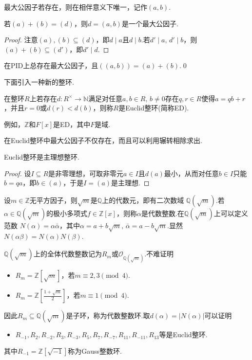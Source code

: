 最大公因子若存在，则在相伴意义下唯一，记作$(a,b)$.
\begin{prop}
    若$(a)+(b)=(d)$，则$d=(a,b)$是一个最大公因子.
\end{prop}
\begin{proof}
    注意$(a),(b)\subseteq(d)$，即$d\mid a$且$d\mid b$.若$d'\mid a,\,d'\mid b$，则$(a)+(b)\subseteq(d')$，即$d'\mid d$.
\end{proof}
\begin{cor*}
    在PID上总存在最大公因子，且$((a,b))=(a)+(b)$.\qed
\end{cor*}

下面引入一种新的整环.
\begin{definition}
    在整环$R$上若存在$d\colon R^\times\to\mathbb{N}$满足对任意$a,b\in R,\,b\ne 0$存在$q,r\in R$使得$a=qb+r$，并且$r=0$或$d(r)<d(b)$，则称$R$是{\heiti Euclid整环}(简称ED).
\end{definition}

例如，$\mathbb{Z}$和$F[x]$是ED，其中$F$是域.

在Euclid整环中最大公因子不仅存在，而且可以利用辗转相除求出.
\begin{thm}
    Euclid整环是主理想整环.
\end{thm}
\begin{proof}
    设$I\subseteq R$是非零理想，可取非零元$a\in I$且$d(a)$最小，从而对任意$b\in I$只能$b=qa$，即$b\in(a)$，于是$I=(a)$是主理想.
\end{proof}

设$m\in\mathbb{Z}$无平方因子，则$\sqrt{m}$是$\mathbb{Q}$上的代数元，即有{\heiti 二次数域} $\mathbb{Q}(\sqrt{m})$.若$\alpha\in\mathbb{Q}(\sqrt{m})$的极小多项式$f\in\mathbb{Z}[x]$，则称$\alpha$是{\heiti 代数整数}.在$\mathbb{Q}(\sqrt{m})$上可以定义{\heiti 范数} $N(\alpha)=\alpha\bar\alpha$，其中$\alpha=a+b\sqrt{m},\,\bar\alpha=a-b\sqrt{m}$.显然$N(\alpha\beta)=N(\alpha)N(\beta)$.

$\mathbb{Q}(\sqrt{m})$上的全体代数整数记为$R_m$或$\mathcal{O}_{\mathbb{Q}(\sqrt{m})}$.不难证明
\begin{itemize}
    \item $R_m=\mathbb{Z}[\sqrt{m}]$，若$m\equiv 2,3\pmod{4}$.
    \item $R_m=\mathbb{Z}[\frac{1+\sqrt{m}}{2}]$，若$m\equiv 1\pmod{4}$.
\end{itemize}
因此$R_m\subseteq\mathbb{Q}(\sqrt{m})$是子环，称为{\heiti 代数整数环}.取$d(\alpha)=|N(\alpha)|$可以证明
\begin{itemize}
    \item $R_{-1},R_{2},R_{-2},R_3,R_{-3},R_5,R_7,R_{-7},R_{11},R_{-11},R_{13}$等是Euclid整环.
\end{itemize}
其中$R_{-1}=\mathbb{Z}[\sqrt{-1}]$称为{\heiti Gauss整数环}.

